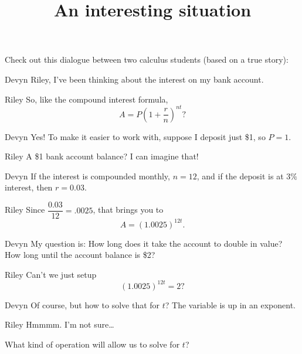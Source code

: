 \documentclass{ximera}
\title[Break-Ground:]{An interesting situation}
\begin{document}
\begin{abstract}
\end{abstract}
\maketitle

Check out this dialogue between two calculus students (based on a true story):

\begin{dialogue}
\item[Devyn] Riley, I've been thinking about the interest on my bank account.
\item[Riley] So, like the compound interest formula, \[ A = P\left( 1 + \frac{r}{n} \right)^{nt}? \]
\item[Devyn] Yes!  To make it easier to work with, suppose I deposit just \$1, so $P=1$.
\item[Riley]  A \$1 bank account balance?  I can imagine that!
\item[Devyn] If the interest is compounded monthly, $n=12$, and if the deposit is at $3\%$ interest, then $r = 0.03$.
\item[Riley] Since $\dfrac{0.03}{12} = .0025$, that brings you to \[ A = \left( 1.0025 \right)^{12t}. \]
\item[Devyn] My question is: How long does it take the account to double in value?  How long until the account balance is \$2?
\item[Riley] Can't we just setup \[ \left(1.0025\right)^{12t} = 2 ?\]
\item[Devyn] Of course, but how to solve that for $t$?  The variable is up in an exponent.
\item[Riley] Hmmmm. I'm not sure\dots
\end{dialogue}


\begin{question}
	What kind of operation will allow us to solve for $t$?
	\begin{multipleChoice}
	\end{multipleChoice}
\end{question}
\end{document}
